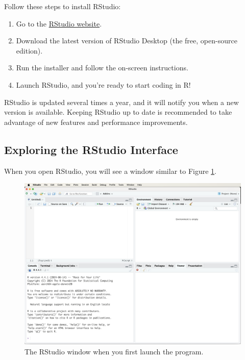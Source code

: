 \documentclass[
  11pt,
]{book}
\providecommand{\tightlist}{%
  \setlength{\itemsep}{0pt}\setlength{\parskip}{0pt}}
\theoremstyle{definition}
\theoremstyle{definition}
\theoremstyle{definition}
\theoremstyle{definition}
\theoremstyle{remark}
\begin{document}
Follow these steps to install RStudio:

\begin{enumerate}
\def\labelenumi{\arabic{enumi}.}
\tightlist
\item
  Go to the \href{http://www.rstudio.com/download}{RStudio website}.\\
\item
  Download the latest version of RStudio Desktop (the free, open-source edition).\\
\item
  Run the installer and follow the on-screen instructions.\\
\item
  Launch RStudio, and you're ready to start coding in R!
\end{enumerate}

RStudio is updated several times a year, and it will notify you when a new version is available. Keeping RStudio up to date is recommended to take advantage of new features and performance improvements.

\subsection*{Exploring the RStudio Interface}\label{exploring-the-rstudio-interface}


When you open RStudio, you will see a window similar to Figure \ref{fig:RStudio-window-1}.

\begin{figure}[H]

{\centering \includegraphics[width=0.7\linewidth]{images/ch1_RStudio-window-1} 

}

\caption{The RStudio window when you first launch the program.}\label{fig:RStudio-window-1}
\end{figure}
\end{document}
